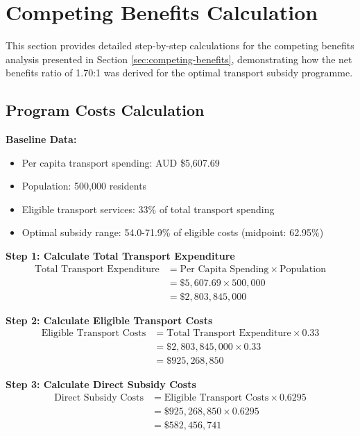\section{Competing Benefits Calculation}\label{app:competing-benefits-calculation}

This section provides detailed step-by-step calculations for the competing benefits analysis presented in Section \ref{sec:competing-benefits}, demonstrating how the net benefits ratio of 1.70:1 was derived for the optimal transport subsidy programme.

\subsection{Program Costs Calculation}
\textbf{Baseline Data:}
\begin{itemize}
    \item Per capita transport spending: AUD \$5,607.69 \citep{ABS_HES_2024}
    \item Population: 500,000 residents
    \item Eligible transport services: 33\% of total transport spending
    \item Optimal subsidy range: 54.0-71.9\% of eligible costs (midpoint: 62.95\%)
\end{itemize}

\textbf{Step 1: Calculate Total Transport Expenditure}
\begin{align}
\text{Total Transport Expenditure} &= \text{Per Capita Spending} \times \text{Population} \\
&= \$5,607.69 \times 500,000 \\
&= \$2,803,845,000
\end{align}

\textbf{Step 2: Calculate Eligible Transport Costs}
\begin{align}
\text{Eligible Transport Costs} &= \text{Total Transport Expenditure} \times 0.33 \\
&= \$2,803,845,000 \times 0.33 \\
&= \$925,268,850
\end{align}

\textbf{Step 3: Calculate Direct Subsidy Costs}
\begin{align}
\text{Direct Subsidy Costs} &= \text{Eligible Transport Costs} \times 0.6295 \\
&= \$925,268,850 \times 0.6295 \\
&= \$582,456,741
\end{align}


